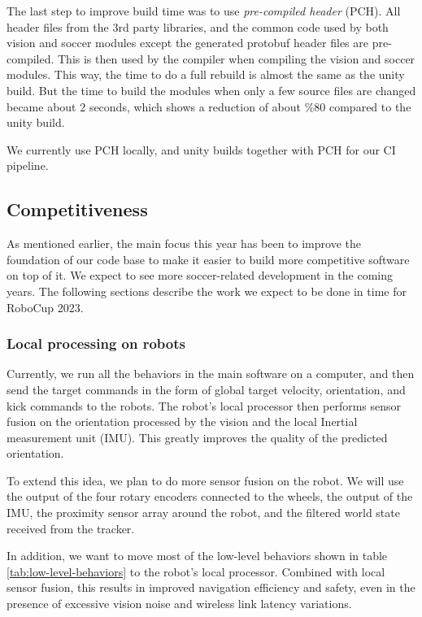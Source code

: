 \documentclass[runningheads]{llncs}
\begin{document}
The last step to improve build time was to use \textit{pre-compiled header} (PCH). All header files from the 3rd party libraries, and the common code used by both vision and soccer modules except the generated protobuf header files are pre-compiled. This is then used by the compiler when compiling the vision and soccer modules. This way, the time to do a full rebuild is almost the same as the unity build. But the time to build the modules when only a few source files are changed became about 2 seconds, which shows a reduction of about \%80 compared to the unity build.

We currently use PCH locally, and unity builds together with PCH for our CI pipeline.

\subsection{Competitiveness}
As mentioned earlier, the main focus this year has been to improve the foundation of our code base to make it easier to build more competitive software on top of it. We expect to see more soccer-related development in the coming years. The following sections describe the work we expect to be done in time for RoboCup 2023.

\subsubsection{Local processing on robots}
Currently, we run all the behaviors in the main software on a computer, and then send the target commands in the form of global target velocity, orientation, and kick commands to the robots. The robot's local processor then performs sensor fusion on the orientation processed by the vision and the local Inertial measurement unit (IMU). This greatly improves the quality of the predicted orientation.

To extend this idea, we plan to do more sensor fusion on the robot. We will use the output of the four rotary encoders connected to the wheels, the output of the IMU, the proximity sensor array around the robot, and the filtered world state received from the tracker.

In addition, we want to move most of the low-level behaviors shown in table \ref{tab:low-level-behaviors} to the robot's local processor. Combined with local sensor fusion, this results in improved navigation efficiency and safety, even in the presence of excessive vision noise and wireless link latency variations.
\end{document}
